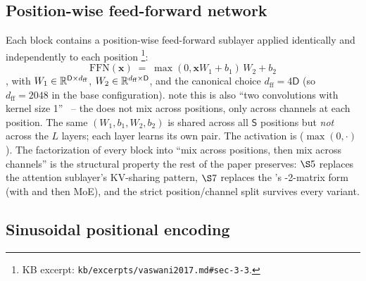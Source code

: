 \subsection{Position-wise feed-forward network}
\label{sec:canonical-ffn}

Each block contains a position-wise feed-forward sublayer applied
identically and independently to each position%
\footnote{KB excerpt: \texttt{kb/excerpts/vaswani2017.md\#sec-3-3}.}:
\begin{equation}
  \mathrm{FFN}(\mathbf{x}) \;=\; \max(0, \mathbf{x} W_1 + b_1) \, W_2 + b_2
  \tag{Vaswani--Eq.~2 (FFN)}
  \label{eq:vaswani-ffn}
\end{equation}
\citep[\S 3.3]{vaswani2017}, with
$W_1 \in \mathbb{R}^{\mathsf{D} \times d_{\text{ff}}}$,
$W_2 \in \mathbb{R}^{d_{\text{ff}} \times \mathsf{D}}$, and the canonical
choice $d_{\text{ff}} = 4 \mathsf{D}$ (so $d_{\text{ff}} = 2048$ in
the base configuration). \citet{vaswani2017} note this is also
``two convolutions with kernel size 1''~\citep[\S 3.3]{vaswani2017}
-- the  does not mix across positions, only across channels at
each position. The same $(W_1, b_1, W_2, b_2)$ is shared across all
$\mathsf{S}$ positions but \emph{not} across the $L$ layers; each
layer learns its own pair. The activation is 
($\max(0, \cdot)$). The factorization of every block into ``mix
across positions, then mix across channels'' is the structural
property the rest of the paper preserves: $\S 5$ replaces the
attention sublayer's KV-sharing pattern, $\S 7$ replaces the 's
-2-matrix form (with  and then MoE), and the strict
position/channel split survives every variant.

\subsection{Sinusoidal positional encoding}
\label{sec:canonical-position}

